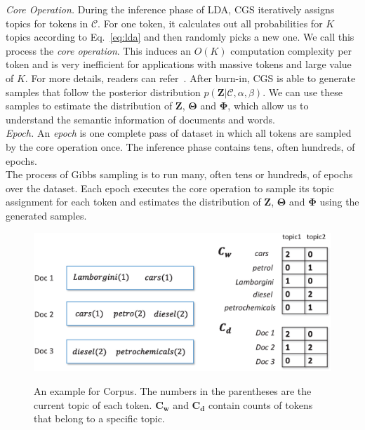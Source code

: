 \documentclass[10pt,journal,cspaper,compsoc]{IEEEtran}
\begin{document}
    \noindent
	{\large \em Core Operation.}
	During the inference phase of LDA, CGS iteratively assigns topics for tokens in $\mathcal{C}$.
	For one token, it calculates out all probabilities for $K$ topics according to Eq.~\ref{eq:lda} and then randomly picks a new one.
	We call this process the {\em core operation}.
	This induces an $O(K)$ computation complexity per token and is very inefficient for applications with massive tokens and large value of $K$.
	For more details, readers can refer~\cite{griffiths2004finding}.
	After burn-in, CGS is able to
	generate samples that follow the posterior distribution $p(\mathbf{Z}|\mathcal{C}, \alpha, \beta)$.
	We can use these samples to estimate the distribution of $\mathbf{Z}$, $\mathbf{\Theta}$ and $\mathbf{\Phi}$, which allow us to 
	understand the semantic information of documents and words.
	\\

	\noindent
	{\large \em Epoch.}
	An {\em epoch} is one complete pass of dataset in which
	all tokens are sampled by the core operation once.
	The inference phase contains tens, often hundreds,
	of epochs.\\
	

	\noindent
	The process of Gibbs sampling is to run many,
	often tens or hundreds, of epochs over the dataset.
	Each epoch executes the core operation 
	to sample its topic assignment for each token and
	estimates the distribution of $\mathbf{Z}$, $\mathbf{\Theta}$ and $\mathbf{\Phi}$
	using the generated samples.
	
	
	
	\begin{figure}
		\centering
		\includegraphics[width=0.8\linewidth]{figures/C_w_C_d.eps}\\
		\caption{An example for Corpus. The numbers in the parentheses
			are the current topic of each token. $\mathbf{C_w}$ and $\mathbf{C_d}$ contain counts of tokens that belong to a specific topic.}
		\label{fg:example}
	\end{figure}
	
\end{document}
